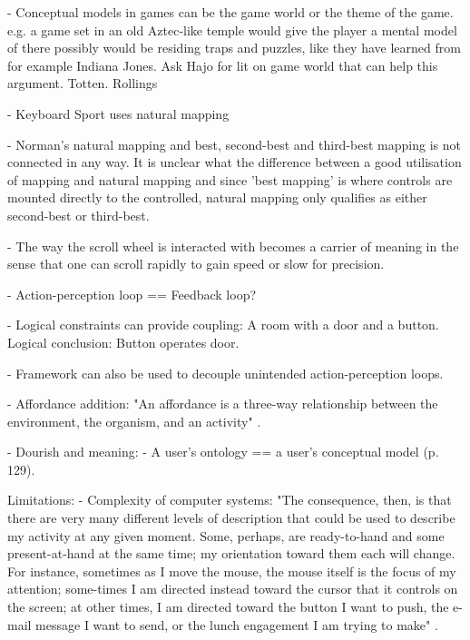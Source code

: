 - Conceptual models in games can be the game world or the theme of the game. e.g. a game set in an old Aztec-like temple would give the player a mental model of there possibly would be residing traps and puzzles, like they have learned from for example Indiana Jones. Ask Hajo for lit on game world that can
help this argument. Totten. Rollings

- Keyboard Sport uses natural mapping

- Norman's natural mapping and best, second-best and third-best mapping is not connected in any way. It is unclear what the difference between a good utilisation of mapping and natural mapping and since 'best mapping' is where controls are mounted directly to the controlled, natural mapping only qualifies as either second-best or third-best.

- The way the scroll wheel is interacted with becomes a carrier of meaning in the sense that one can scroll rapidly to gain speed or slow for precision.

- Action-perception loop == Feedback loop?

- Logical constraints can provide coupling: A room with a door and a button. Logical conclusion: Button operates door.

- Framework can also be used to decouple unintended action-perception loops.

 - Affordance addition: "An affordance is a three-way relationship between the environment, the organism, and an activity" \cite[p. 118]{dourish}.

 - Dourish and meaning:
  - A user's ontology == a user's conceptual model (p. 129).


Limitations:
 - Complexity of computer systems: "The consequence, then, is that there are very many different levels of description that could be used to describe my activity at any given moment. Some, perhaps, are ready-to-hand and some present-at-hand at the same time; my orientation toward them each will change. For instance, sometimes as I move the mouse, the mouse itself is the focus of my attention; some-times I am directed instead toward the cursor that it controls on the screen; at other times, I am directed toward the button I want to push, the e-mail message I want to send, or the lunch engagement I am trying to make" \cite[p. 140]{dourish}.
